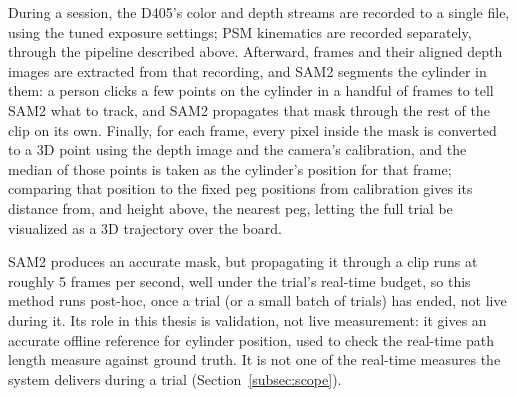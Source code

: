 During a session, the D405's color and depth streams are recorded to
a single file, using the tuned exposure settings; PSM kinematics are
recorded separately, through the pipeline described above. Afterward,
frames and their aligned depth images are extracted from that
recording, and SAM2 segments the cylinder in them: a person clicks a
few points on the cylinder in a handful of frames to tell SAM2 what
to track, and SAM2 propagates that mask through the rest of the clip
on its own. Finally, for each frame, every pixel inside the mask is
converted to a 3D point using the depth image and the camera's
calibration, and the median of those points is taken as the
cylinder's position for that frame; comparing that position to the
fixed peg positions from calibration gives its distance from, and
height above, the nearest peg, letting the full trial be visualized
as a 3D trajectory over the board.

SAM2 produces an accurate mask, but propagating it through a clip runs
at roughly 5 frames per second, well under the trial's real-time
budget, so this method runs post-hoc, once a trial (or a small batch
of trials) has ended, not live during it. Its role in this thesis is
validation, not live measurement: it gives an accurate offline
reference for cylinder position, used to check the real-time path
length measure against ground truth. It is not one of the real-time
measures the system delivers during a trial (Section~\ref{subsec:scope}).